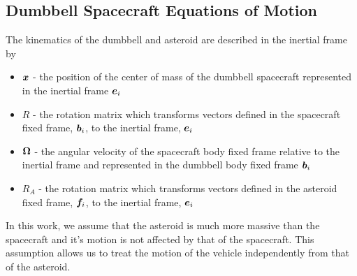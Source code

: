 \documentclass[letterpaper, paper,11pt]{AAS}		%
\begin{document}
\subsection{Dumbbell Spacecraft Equations of Motion}\label{sec:dumbbell}

The kinematics of the dumbbell and asteroid are described in the inertial frame by
\begin{itemize}
    \item \( \bm{x} \) - the position of the center of mass of the dumbbell spacecraft represented in the inertial frame \( \bm{e}_i\)
    \item \( R \) - the rotation matrix which transforms vectors defined in the spacecraft fixed frame, \( \bm{b}_i \), to the inertial frame, \( \bm{e}_i \)
    \item \( \bm{\Omega} \) - the angular velocity of the spacecraft body fixed frame relative to the inertial frame and represented in the dumbbell body fixed frame \( \bm{b}_i \)
    \item \( R_A \) - the rotation matrix which transforms vectors defined in the asteroid fixed frame, \( \bm{f}_i \), to the inertial frame, \( \bm{e}_i \)
\end{itemize}
In this work, we assume that the asteroid is much more massive than the spacecraft and it's motion is not affected by that of the spacecraft.
This assumption allows us to treat the motion of the vehicle independently from that of the asteroid. 
\end{document}
